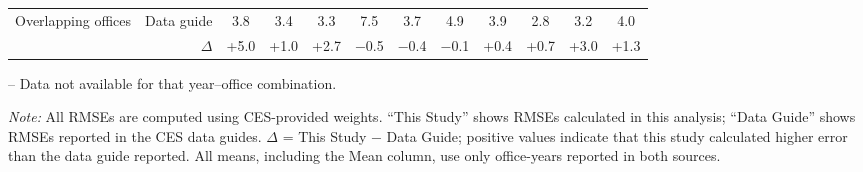 \begin{table}[p]
{\begin{threeparttable}
\begin{tabular}{lrcccccccccc}
Overlapping offices & Data guide & 3.8 & 3.4 & 3.3 & 7.5 & 3.7 & 4.9 & 3.9 & 2.8 & 3.2 & 4.0 \\
 & $\Delta$ & +5.0 & +1.0 & +2.7 & $-$0.5 & $-$0.4 & $-$0.1 & +0.4 & +0.7 & +3.0 & +1.3 \\
\bottomrule
\end{tabular}
\begin{tablenotes}
\footnotesize
\item -- Data not available for that year--office combination.
\item \textit{Note:} All RMSEs are computed using CES-provided weights. ``This Study'' shows RMSEs calculated in this analysis; ``Data Guide'' shows RMSEs reported in the CES data guides. $\Delta$ = This Study $-$ Data Guide; positive values indicate that this study calculated higher error than the data guide reported. All means, including the Mean column, use only office-years reported in both sources.
\end{tablenotes}
\end{threeparttable}%
}
\end{table}